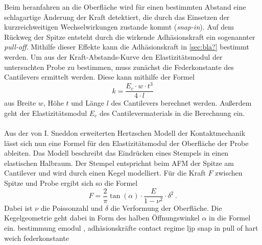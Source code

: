 Beim heranfahren an die Oberfläche wird für einen bestimmten Abstand eine schlagartige Änderung der Kraft detektiert, die durch das Einsetzen der kurzreichweitigen Wechselwirkungen zustande kommt (\textit{snap-in}). Auf dem Rückweg der Spitze entsteht durch die wirkende Adhäsionskraft ein sogenannter \textit{pull-off}. Mithilfe dieser Effekte kann die Adhäsionskraft in \autoref{sec:bla?} bestimmt werden.
Um aus der Kraft-Abstands-Kurve den Elastizitätsmodul der untersuchten Probe zu bestimmen, muss zunächst die Federkonstante des Cantilevers ermittelt werden. Diese kann mithilfe der Formel
\begin{equation}
  \label{eqn:federkonst}
  k = \frac{E_c\cdot w\cdot t^3}{4\cdot l}
\end{equation}
aus Breite $w$, Höhe $t$ und Länge $l$ des Cantilevers berechnet werden. Außerdem geht der Elastizitätsmodul $E_c$ des Cantilevermaterials in die Berechnung ein.\\
\\
Aus der von I. Sneddon erweiterten Hertzschen Modell der Kontaktmechanik lässt sich nun eine Formel für den Elastizitätsmodul der Oberfläche der Probe ableiten. Das Modell beschreibt das Eindrücken eines Stempels in einen elastischen Halbraum. Der Stempel entsprichnt beim AFM der Spitze am Cantilever und wird durch einen Kegel modelliert. Für die Kraft $F$ zwischen Spitze und Probe ergibt sich so die Formel
\begin{equation}
  \label{eqn:emodul}
  F = \frac{2}{\pi} \tan{(\alpha)}\cdot\frac{E}{1-\nu^2}\cdot\delta^2\, .
\end{equation}
Dabei ist $\nu$ die Poissonzahl und $\delta$ die Verformung der Oberfläche.
Die Kegelgeometrie geht dabei in Form des halben Öffnungswinkel $\alpha$ in die Formel ein.
bestimmung emodul , adhäsionskräfte
contact regime ljp
snap in pull of
hart weich
federkonstante
